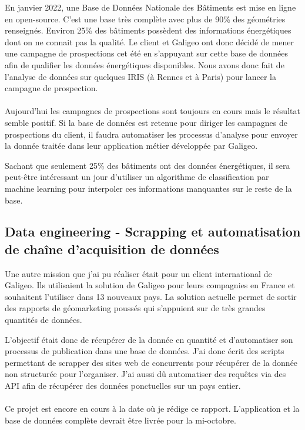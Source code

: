 En janvier 2022, une Base de Données Nationale des Bâtiments \cite{BDNB} est mise en ligne en open-source. C’est une base très complète avec plus de 90\% des géométries renseignés. Environ 25\% des bâtiments possèdent des informations énergétiques dont on ne connait pas la qualité. Le client et Galigeo ont donc décidé de mener une campagne de prospections cet été en s’appuyant sur cette base de données afin de qualifier les données énergétiques disponibles. Nous avons donc fait de l’analyse de données sur quelques IRIS (à Rennes et à Paris) pour lancer la campagne de prospection.

\paragraph{}

Aujourd’hui les campagnes de prospections sont toujours en cours mais le résultat semble positif. Si la base de données est retenue pour diriger les campagnes de prospections du client, il faudra automatiser les processus d’analyse pour envoyer la donnée traitée dans leur application métier développée par Galigeo.

Sachant que seulement 25\% des bâtiments ont des données énergétiques, il sera peut-être intéressant un jour d’utiliser un algorithme de classification par machine learning pour interpoler ces informations manquantes sur le reste de la base. 


\subsection{Data engineering - Scrapping et automatisation de chaîne d'acquisition de données}

Une autre mission que j’ai pu réaliser était pour un client international de Galigeo. Ils utilisaient la solution de Galigeo pour leurs compagnies en France et souhaitent l’utiliser dans 13 nouveaux pays. La solution actuelle permet de sortir des rapports de géomarketing poussés qui s’appuient sur de très grandes quantités de données.

L’objectif était donc de récupérer de la donnée en quantité et d’automatiser son processus de publication dans une base de données. J’ai donc écrit des scripts permettant de scrapper des sites web de concurrents pour récupérer de la donnée non structurée pour l’organiser. J’ai aussi dû automatiser des requêtes via des API afin de récupérer des données ponctuelles sur un pays entier.

\paragraph*{}

Ce projet est encore en cours à la date où je rédige ce rapport. L’application et la base de données complète devrait être livrée pour la mi-octobre.
